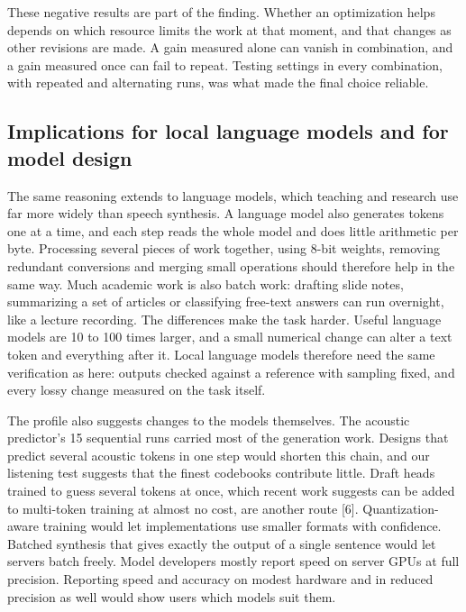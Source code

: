 \documentclass[11pt]{article}
\begin{document}
These negative results are part of the finding. Whether an optimization
helps depends on which resource limits the work at that moment, and that
changes as other revisions are made. A gain measured alone can vanish in
combination, and a gain measured once can fail to repeat. Testing
settings in every combination, with repeated and alternating runs, was
what made the final choice reliable.

\hypertarget{implications-for-local-language-models-and-for-model-design}{%
\subsection{Implications for local language models and for model
design}\label{implications-for-local-language-models-and-for-model-design}}

The same reasoning extends to language models, which teaching and
research use far more widely than speech synthesis. A language model
also generates tokens one at a time, and each step reads the whole model
and does little arithmetic per byte. Processing several pieces of work
together, using 8-bit weights, removing redundant conversions and
merging small operations should therefore help in the same way. Much
academic work is also batch work: drafting slide notes, summarizing a
set of articles or classifying free-text answers can run overnight, like
a lecture recording. The differences make the task harder. Useful
language models are 10 to 100 times larger, and a small numerical change
can alter a text token and everything after it. Local language models
therefore need the same verification as here: outputs checked against a
reference with sampling fixed, and every lossy change measured on the
task itself.

The profile also suggests changes to the models themselves. The acoustic
predictor's 15 sequential runs carried most of the generation work.
Designs that predict several acoustic tokens in one step would shorten
this chain, and our listening test suggests that the finest codebooks
contribute little. Draft heads trained to guess several tokens at once,
which recent work suggests can be added to multi-token training at
almost no cost, are another route {[}6{]}. Quantization-aware training
would let implementations use smaller formats with confidence. Batched
synthesis that gives exactly the output of a single sentence would let
servers batch freely. Model developers mostly report speed on server
GPUs at full precision. Reporting speed and accuracy on modest hardware
and in reduced precision as well would show users which models suit
them.
\end{document}
